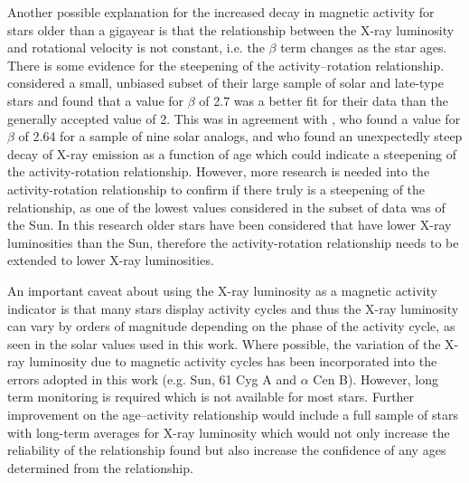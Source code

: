 Another possible explanation for the increased decay in magnetic activity for stars older than a gigayear is that the relationship between the X-ray luminosity and rotational velocity is not constant, i.e. the $\beta$ term changes as the star ages. There is some evidence for the steepening of the activity--rotation relationship. \citet{Wright_etal_2011} considered a small, unbiased subset of their large sample of solar and late-type stars and found that a value for $\beta$ of 2.7 was a better fit for their data than the generally accepted value of 2. This was in agreement with \citet{Gudel_etal_1997}, who found a value for $\beta$ of 2.64 for a sample of nine solar analogs, and \citet{Feigelson_etal_2004} who found an unexpectedly steep decay of X-ray emission as a function of age which could indicate a steepening of the activity-rotation relationship. However, more research is needed into the activity-rotation relationship to confirm if there truly is a steepening of the relationship, as one of the lowest values considered in the \citet{Wright_etal_2011} subset of data was of the Sun. In this research older stars have been considered that have lower X-ray luminosities than the Sun, therefore the activity-rotation relationship needs to be extended to lower X-ray luminosities.

An important caveat about using the X-ray luminosity as a magnetic activity indicator is that many stars display activity cycles and thus the X-ray luminosity can vary by orders of magnitude depending on the phase of the activity cycle, as seen in the solar values used in this work. Where possible, the variation of the X-ray luminosity due to magnetic activity cycles has been incorporated into the errors adopted in this work (e.g. Sun, 61 Cyg A and $\alpha$ Cen B). However, long term monitoring is required which is not available for most stars. Further improvement on the age--activity relationship would include a full sample of stars with long-term averages for X-ray luminosity which would not only increase the reliability of the relationship found but also increase the confidence of any ages determined from the relationship.

